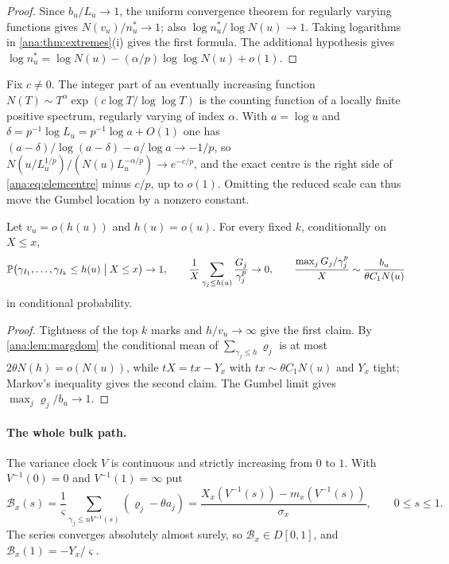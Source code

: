 \begin{proof}
Since $b_u/L_u\to1$, the uniform convergence theorem for regularly varying functions
\cite{BinghamGoldieTeugels1987Regular} gives $N(v_u)/n_u^*\to1$; also $\log n_u^*/\log N(u)\to1$. Taking
logarithms in \cref{ana:thm:extremes}(i) gives the first formula. The additional hypothesis gives
$\log n_u^*=\log N(u)-(\alpha/p)\log\log N(u)+o(1)$.
\end{proof}

\begin{remark}\label{ana:rem:slowcount}
Fix $c\ne0$. The integer part of an eventually increasing function
$N(T)\sim T^\alpha\exp(c\log T/\log\log T)$ is the counting function of a locally finite positive spectrum,
regularly varying of index $\alpha$. With $a=\log u$ and $\delta=p^{-1}\log L_u=p^{-1}\log a+O(1)$ one has
$(a-\delta)/\log(a-\delta)-a/\log a\to-1/p$, so $N(u/L_u^{1/p})/(N(u)L_u^{-\alpha/p})\to e^{-c/p}$, and the
exact centre is the right side of \eqref{ana:eq:elemcentre} minus $c/p$, up to $o(1)$. Omitting the
reduced scale can thus move the Gumbel location by a nonzero constant.
\end{remark}

\begin{corollary}\label{ana:cor:vanishingmass}
Let $v_u=o(h(u))$ and $h(u)=o(u)$. For every fixed $k$, conditionally on $X\le x$,
\[
 \mathbb{P}\bigl(\gamma_{I_1},\dots,\gamma_{I_k}\le h(u)\bigm| X\le x\bigr)\to1,\qquad
 \frac1X\sum_{\gamma_j\le h(u)}\frac{G_j}{\gamma_j^p}\to0,\qquad
 \frac{\max_jG_j/\gamma_j^p}X\sim\frac{b_u}{\theta C_1N(u)}
\]
in conditional probability.
\end{corollary}

\begin{proof}
Tightness of the top $k$ marks and $h/v_u\to\infty$ give the first claim. By \cref{ana:lem:margdom}
the conditional mean of $\sum_{\gamma_j\le h}\varrho_j$ is at most $2\theta N(h)=o(N(u))$, while
$tX=tx-Y_x$ with $tx\sim\theta C_1N(u)$ and $Y_x$ tight; Markov's inequality gives the second claim. The
Gumbel limit gives $\max_j\varrho_j/b_u\to1$.
\end{proof}

\paragraph{The whole bulk path.}
The variance clock $V$ is continuous and strictly increasing from $0$ to $1$. With $V^{-1}(0)=0$ and
$V^{-1}(1)=\infty$ put
\[
 \mathcal B_x(s)=\frac1\varsigma\sum_{\gamma_j\le uV^{-1}(s)}(\varrho_j-\theta a_j)
 =\frac{X_x(V^{-1}(s))-m_x(V^{-1}(s))}{\sigma_x},\qquad0\le s\le1 .
\]
The series converges absolutely almost surely, so $\mathcal B_x\in D[0,1]$, and
$\mathcal B_x(1)=-Y_x/\varsigma$.

